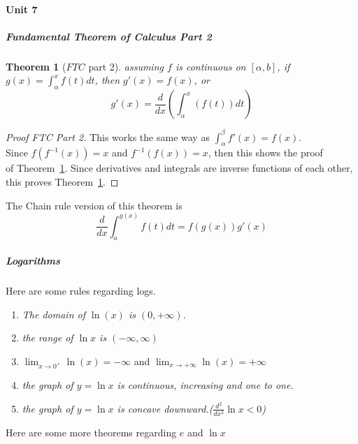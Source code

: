 \documentclass{article} %
\theoremstyle{theorem}
\newtheorem{theorem}{Theorem}[paragraph]
\theoremstyle{definition}
\begin{document}
            \paragraph{Unit 7}
                \subparagraph{Fundamental Theorem of Calculus Part 2}
                    \begin{theorem}[$FTC$ part 2]
                        \label{thm:FTCpt2}
                        assuming $f$ is continuous on $[\alpha,b]$, if $g(x)=\int_{\alpha}^{x}f(t)dt$, then $g'(x)=f(x)$, or \begin{equation} g'(x) = \frac{d}{dx}(\int_{\alpha}^{x}(f(t))dt) \end{equation}
                    \end{theorem}
                    \begin{proof}[Proof FTC Part 2]
                        This works the same way as $\int_{\alpha}^{\beta}f'(x)=f(x)$. \\Since $f(f^{-1}(x))=x$ and $f^{-1}(f(x))=x$, then this shows the proof \\of Theorem~\ref{thm:FTCpt2}.
                        Since derivatives and integrals are inverse functions of each other, this proves Theorem~\ref{thm:FTCpt2}.
                    \end{proof}
                    The Chain rule version of this theorem is \begin{equation}
                        \frac{d}{dx}\int_{a}^{g(x)}f(t)dt = f(g(x))g'(x)
                    \end{equation}
                \subparagraph{Logarithms}
                    Here are some rules regarding logs.
                    \begin{enumerate}
                        \item \textit{The domain of \emph{$\ln(x)$} is \emph{$(0,+\infty)$}.}
                        \item \textit{the range of \emph{$\ln x$} is $(-\infty,\infty)$}
                        \item $\lim_{x\rightarrow0^+}\ln(x)=-\infty$ and $\lim_{x\rightarrow+\infty}\ln(x)=+\infty$
                        \item \textit{the graph of \emph{$y=\ln x$} is continuous, increasing and one to one.}
                        \item \textit{the graph of \emph{$y=\ln x$} is concave downward.(\emph{$\frac{d^2}{dx^2}\ln x < 0$})}
                    \end{enumerate}
                    Here are some more theorems regarding $e$ and $\ln x$
\end{document}
